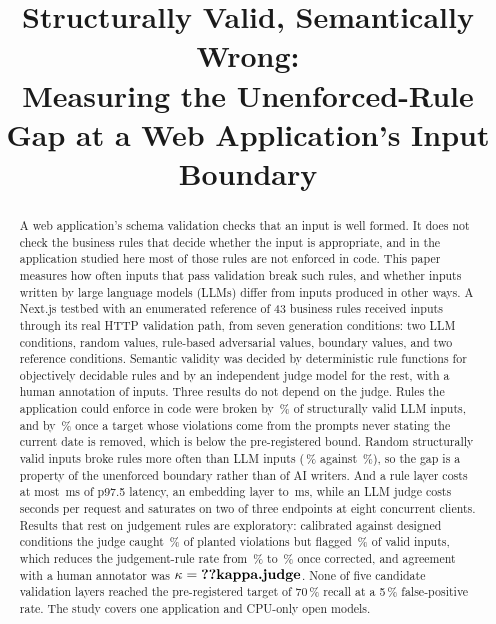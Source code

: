 \documentclass[conference]{IEEEtran}
\begin{document}
\title{Structurally Valid, Semantically Wrong:\\Measuring the Unenforced-Rule Gap at a Web Application's Input Boundary}

\author{
}

\maketitle

\begin{abstract}
A web application's schema validation checks that an input is well formed. It does not check the
business rules that decide whether the input is appropriate, and in the application studied here most
of those rules are not enforced in code. This paper measures how often inputs that pass validation
break such rules, and whether inputs written by large language models (LLMs) differ from inputs
produced in other ways. A Next.js testbed with an enumerated reference of 43 business rules received
 inputs through its real HTTP validation path, from seven generation conditions: two LLM
conditions, random values, rule-based adversarial values, boundary values, and two reference
conditions. Semantic validity was decided by deterministic rule functions for objectively decidable
rules and by an independent judge model for the rest\ifhumanlabels{}, with a human annotation of
 inputs\fi. Three results do not depend on the judge. Rules the application could enforce
in code were broken by \,\% of structurally valid LLM inputs, and by
\,\% once a target whose violations come from the prompts never stating the
current date is removed, which is below the pre-registered bound. Random structurally valid inputs
broke rules more often than LLM inputs (\,\% against \,\%), so the gap is a
property of the unenforced boundary rather than of AI writers. And a rule layer costs at most
\,ms of p97.5 latency, an embedding layer
 to \,ms, while an LLM judge costs seconds per request and
saturates on two of three endpoints at eight concurrent clients. Results that rest on judgement rules
are exploratory: calibrated against designed conditions the judge caught \,\% of planted
violations but flagged \,\% of valid inputs, which reduces the judgement-rule rate from
\,\% to \,\% once corrected\ifhumanlabels{}, and agreement with a human
annotator was $\kappa=\R{kappa.judge}$\fi. None of five candidate validation layers reached the
pre-registered target of 70\,\% recall at a 5\,\% false-positive rate. The study covers one
application and CPU-only open models.
\end{abstract}
\end{document}
